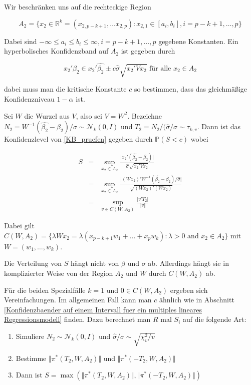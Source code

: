 \documentclass[12pt,a4paper]{article}
\theoremstyle{definition}
\theoremstyle{definition}
\theoremstyle{definition}
\theoremstyle{definition}
\begin{document}
Wir beschränken uns auf die rechteckige Region

\begin{equation*}
A_2 = \{ x_2 \in \mathbb{R}^k =(x_{2,p-k+1}, \ldots x_{2,p}) : x_{2,1} \in [a_i,b_i], i=p-k+1, \ldots, p \}
\end{equation*}

Dabei sind $- \infty \leq a_i \leq b_i \leq \infty, i = p-k+1, \ldots, p$ gegebene Konstanten. Ein hyperbolisches Konfidenzband auf $A_2$ ist gegeben durch

\begin{equation}\label{KB_pruefen}
x_2'\beta_2 \in x_2'\hat{\beta_2} \pm c \hat{\sigma}\sqrt{x_2'Vx_2} \text{ für alle } x_2 \in A_2
\end{equation}

dabei muss man die kritische Konstante $c$ so bestimmen, dass das gleichmäßige Konfidenzniveau $1 - \alpha$ ist.

Sei $W$ die Wurzel aus $V$, also sei $V=W^2$. Bezeichne $N_2=W^{-1}(\hat{\beta_2}-\beta_2)/\sigma \sim \mathscr{N}_{k}(0,I)$ und $T_2 = N_2/(\hat{\sigma}/\sigma \sim \tau_{k,v}$. Dann ist das Konfidenzlevel von \eqref{KB_pruefen} gegeben durch $\mathbb{P}(S<c)$ wobei

\begin{eqnarray*}
S &=& \sup_{x_2 \in A_2} \frac{\vert x_2' (\hat{\beta_2} - \beta_2) \vert }{\hat{\sigma} \sqrt{x_2' V  x_2}} \\
&=& \sup_{x_2 \in A_2} \frac{\vert (Wx_2)'W^{-1} (\hat{\beta_2}-\beta_2)/\hat{\sigma} \vert}{\sqrt{(Wx_2)'(Wx_2)}} \\
&=& \sup_{v \in C(W,A_2)} \frac{\vert v'T_2 \vert }{\Vert v \Vert}
\end{eqnarray*}

Dabei gilt $C(W,A_2)=\{ \lambda W x_2 = \lambda(x_{p-k+1} w_1 + \ldots + x_p w_k) : \lambda > 0 \text{ and } x_2 \in A_2 \}$ mit $W=(w_1, \ldots, w_k)$. 

Die Verteilung von $S$ hängt nicht von $\beta$ und $\sigma$ ab. Allerdings hängt sie in komplizierter Weise von der Region $A_2$ und $W$ durch $C(W,A_2)$ ab.

Für die beiden Spezialfälle $k=1$ und $0 \in C(W,A_2)$ ergeben sich Vereinfachungen. Im allgemeinen Fall kann man $c$ ähnlich wie in Abschnitt \ref{Konfidenzbaender auf einem Intervall fuer ein multiples lineares Regressionsmodell} finden. Dazu berechnet man $R$ mal $S_i$ auf die folgende Art:

\begin{enumerate}
\item Simuliere $N_2 \sim \mathscr{N}_{k}(0,I)$ und $\hat{\sigma}/\sigma \sim \sqrt{\chi^2_v/v}$
\item Bestimme $\Vert \pi^{*}(T_2,W,A_2) \Vert$ und $\Vert \pi^{*}(-T_2,W,A_2) \Vert$
\item Dann ist $S= \max(\Vert \pi^{*}(T_2,W,A_2) \Vert, \Vert \pi^{*}(-T_2,W,A_2) \Vert )$
\end{enumerate}
\end{document}
